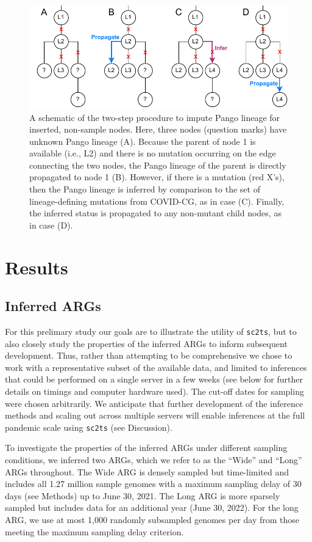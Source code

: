 \documentclass{article}
\begin{document}
\begin{figure} \centering
\includegraphics[width=.7\textwidth]{figures/imputation.pdf}
\caption{\label{fig:imputation}A schematic of the two-step procedure to impute
Pango lineage for inserted, non-sample nodes. Here, three nodes (question
marks) have unknown Pango lineage (A). Because the parent of node 1 is
available (i.e., L2) and there is no mutation occurring on the edge connecting
the two nodes, the Pango lineage of the parent is directly propagated to node 1
(B). However, if there is a mutation (red X’s), then the Pango lineage is
inferred by comparison to the set of lineage-defining mutations from
COVID-CG\citep{Chen2021-zc}, as in case (C). Finally, the inferred status is
propagated to any non-mutant child nodes, as in case (D).
}
\end{figure}


\section{Results}
\subsection{Inferred ARGs}
For this prelimary study our goals are to illustrate the utility of
\texttt{sc2ts}, but to also closely study the properties of the
inferred ARGs to inform subsequent development. Thus, rather
than attempting to be comprehensive we chose to work with a
representative subset of the available data, and limited to
inferences that could be performed on a single server in
a few weeks (see below for further details on timings and
computer hardware used). The cut-off dates for sampling were chosen
arbitrarily. We anticipate that further development of the
inference methods and scaling out across multiple servers will
enable inferences at the full pandemic scale using \texttt{sc2ts}
(see Discussion).

To investigate the properties of the inferred ARGs under different
sampling conditions, we inferred two ARGs, which we refer to as the
``Wide'' and ``Long'' ARGs throughout.
The Wide ARG is densely sampled but time-limited and
includes all 1.27 million sample genomes  with a
maximum sampling delay of 30 days (see Methods) up to June 30, 2021.
The Long ARG is more sparsely sampled but
includes data for an additional year (June 30, 2022).
For the long ARG, we use at most 1,000 randomly subsampled
genomes per day from those meeting the maximum sampling delay criterion.
\end{document}
